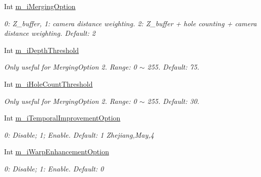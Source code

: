 \begin{DoxyCompactItemize}
Int \hyperlink{class_c_parameter_view_interpolation_a5a3654fe382b2d4beeb0f2c1c0676b4b}{m\+\_\+i\+Merging\+Option}
\begin{DoxyCompactList}\small\item\em 0\+: Z\+\_\+buffer, 1\+: camera distance weighting. 2\+: Z\+\_\+buffer + hole counting + camera distance weighting. Default\+: 2 \end{DoxyCompactList}\item 
\mbox{\label{class_c_parameter_view_interpolation_a458a49f03a5c6f647c2ad87ac757c407}} 
Int \hyperlink{class_c_parameter_view_interpolation_a458a49f03a5c6f647c2ad87ac757c407}{m\+\_\+i\+Depth\+Threshold}
\begin{DoxyCompactList}\small\item\em Only useful for Merging\+Option 2. Range\+: 0 $\sim$ 255. Default\+: 75. \end{DoxyCompactList}\item 
\mbox{\label{class_c_parameter_view_interpolation_ae8fcc676353f00fcbcd64d177bad0eb0}} 
Int \hyperlink{class_c_parameter_view_interpolation_ae8fcc676353f00fcbcd64d177bad0eb0}{m\+\_\+i\+Hole\+Count\+Threshold}
\begin{DoxyCompactList}\small\item\em Only useful for Merging\+Option 2. Range\+: 0 $\sim$ 255. Default\+: 30. \end{DoxyCompactList}\item 
\mbox{\label{class_c_parameter_view_interpolation_aa3ea109ae2d12b66c6f28ad2cf19a9f2}} 
Int \hyperlink{class_c_parameter_view_interpolation_aa3ea109ae2d12b66c6f28ad2cf19a9f2}{m\+\_\+i\+Temporal\+Improvement\+Option}
\begin{DoxyCompactList}\small\item\em 0\+: Disable; 1; Enable. Default\+: 1 Zhejiang,May,4 \end{DoxyCompactList}\item 
\mbox{\label{class_c_parameter_view_interpolation_a2d51038c15586b492ac8c38c46c9de65}} 
Int \hyperlink{class_c_parameter_view_interpolation_a2d51038c15586b492ac8c38c46c9de65}{m\+\_\+i\+Warp\+Enhancement\+Option}
\begin{DoxyCompactList}\small\item\em 0\+: Disable; 1\+: Enable. Default\+: 0 \end{DoxyCompactList}\item 

\end{DoxyCompactItemize}
